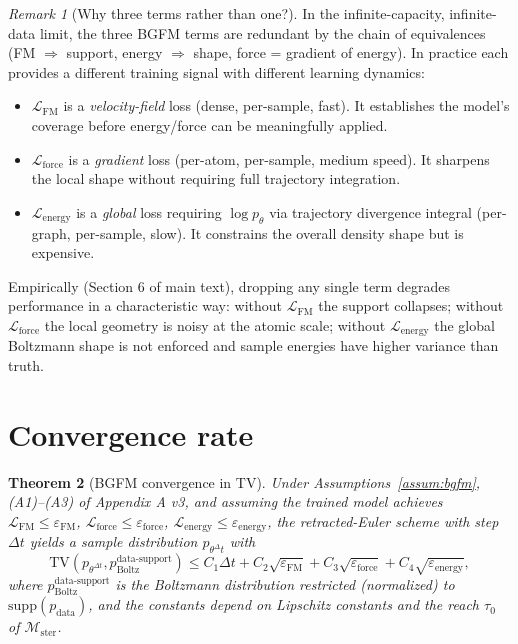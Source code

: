 \documentclass[11pt]{article}
\newtheorem{theorem}{Theorem}
\theoremstyle{remark}
\newtheorem{remark}[theorem]{Remark}
\theoremstyle{plain}
\newcommand{\M}{\mathcal{M}}
\newcommand{\ster}{\mathrm{ster}}
\newcommand{\FM}{\mathrm{FM}}
\newcommand{\force}{\mathrm{force}}
\newcommand{\energy}{\mathrm{energy}}
\newcommand{\TV}{\mathrm{TV}}
\begin{document}
\begin{remark}[Why three terms rather than one?]
In the infinite-capacity, infinite-data limit, the three BGFM terms are
redundant by the chain of equivalences (FM $\Rightarrow$ support,
energy $\Rightarrow$ shape, force = gradient of energy). In practice
each provides a different training signal with different learning
dynamics:

\begin{itemize}
\item $\mathcal{L}_\FM$ is a \emph{velocity-field} loss (dense, per-sample,
      fast). It establishes the model's coverage before energy/force can
      be meaningfully applied.
\item $\mathcal{L}_\force$ is a \emph{gradient} loss (per-atom, per-sample,
      medium speed). It sharpens the local shape without requiring
      full trajectory integration.
\item $\mathcal{L}_\energy$ is a \emph{global} loss requiring $\log p_\theta$
      via trajectory divergence integral (per-graph, per-sample, slow).
      It constrains the overall density shape but is expensive.
\end{itemize}

Empirically (Section 6 of main text), dropping any single term degrades
performance in a characteristic way: without $\mathcal{L}_\FM$ the
support collapses; without $\mathcal{L}_\force$ the local geometry is
noisy at the atomic scale; without $\mathcal{L}_\energy$ the global
Boltzmann shape is not enforced and sample energies have higher
variance than truth.
\end{remark}

\section{Convergence rate}

\begin{theorem}[BGFM convergence in TV]\label{thm:bgfm-conv}
Under Assumptions~\ref{assum:bgfm}, (A1)--(A3) of Appendix A v3, and
assuming the trained model achieves
$\mathcal{L}_\FM \le \varepsilon_\FM$, $\mathcal{L}_\force \le
\varepsilon_\force$, $\mathcal{L}_\energy \le \varepsilon_\energy$,
the retracted-Euler scheme with step $\Delta t$ yields a sample
distribution $p_{\theta^\Delta t}$ with
\[
\TV(p_{\theta^{\Delta t}}, p_\text{Boltz}^\text{data-support})
  \le C_1 \Delta t + C_2 \sqrt{\varepsilon_\FM}
    + C_3 \sqrt{\varepsilon_\force} + C_4 \sqrt{\varepsilon_\energy},
\]
where $p_\text{Boltz}^\text{data-support}$ is the Boltzmann distribution
restricted (normalized) to $\mathrm{supp}(p_\text{data})$, and the
constants depend on Lipschitz constants and the reach $\tau_0$ of
$\M_\ster$.
\end{theorem}
\end{document}
